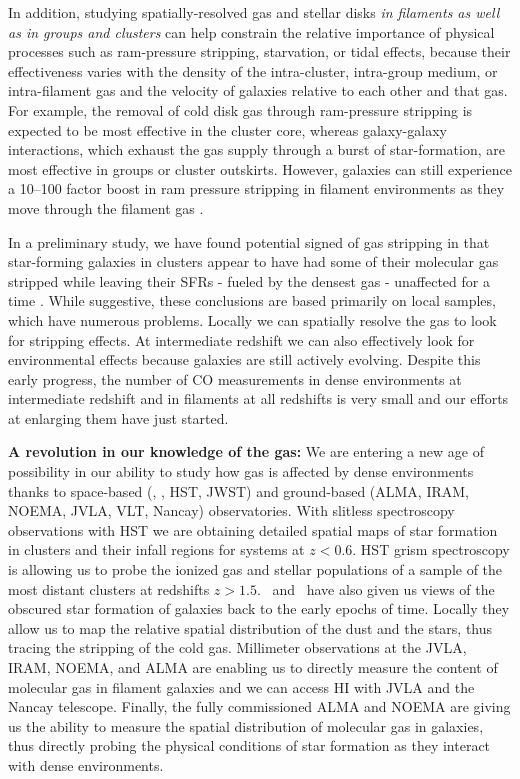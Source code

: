 \documentclass[11pt]{article}
\begin{document}
In addition, studying spatially-resolved gas and stellar disks {\em in filaments as well as in groups and clusters} can help constrain the relative importance
of physical processes such as ram-pressure stripping, starvation, or tidal effects, because their effectiveness varies with
the density of the intra-cluster, intra-group medium, or intra-filament gas and the
velocity of galaxies relative to each other and that gas.  For example, the removal of cold disk gas through
ram-pressure stripping is expected to be most effective in the cluster
core, whereas galaxy-galaxy interactions, which exhaust the gas supply
through a burst of star-formation, are most effective in groups or
cluster outskirts.  However, galaxies can still experience a 10--100 factor boost in ram pressure stripping in filament environments as they move through the filament gas \citep{Bahe13}.

In a preliminary study, we have found potential signed of gas stripping in that star-forming galaxies in
clusters appear to have had some of their molecular gas stripped while
leaving their SFRs - fueled by the densest gas - unaffected for a time
\citep{Jablonka13}.  While suggestive, these conclusions are based
primarily on local samples, which have numerous problems.  Locally we can spatially resolve the gas to look for stripping effects.  At intermediate redshift we can also effectively look for environmental effects
because galaxies are still actively evolving.  Despite this early progress, the number of
CO measurements in dense environments at intermediate redshift and in filaments at all redshifts is very small and our efforts at
enlarging them have just started.  

\textbf{A revolution in our knowledge of the gas:} We are entering a
new age of possibility in our ability to study how gas is affected by
dense environments thanks to space-based (\spitzer, \herschel, HST,
JWST) and ground-based (ALMA, IRAM, NOEMA, JVLA, VLT, Nancay)
observatories.  With slitless spectroscopy
observations with HST we are obtaining detailed spatial
maps of star formation in clusters and their infall regions for
systems at $z<0.6$.  HST grism spectroscopy is allowing us to probe
the ionized gas and stellar populations of a sample of the most
distant clusters at redshifts $z>1.5$.  \spitzer\ and \herschel\ have
also given us views of the obscured star formation of galaxies back to
the early epochs of time.  Locally they allow us to map the relative
spatial distribution of the dust and the stars, thus tracing the
stripping of the cold gas.  Millimeter observations at the JVLA, IRAM, NOEMA,
and ALMA are enabling us to directly measure the content of molecular
gas in filament galaxies and we can access HI with JVLA and the Nancay telescope.  Finally, the fully commissioned ALMA and NOEMA are giving us
the ability to measure the spatial distribution of molecular gas in
galaxies, thus directly probing the physical conditions of star
formation as they interact with dense environments.
\end{document}
